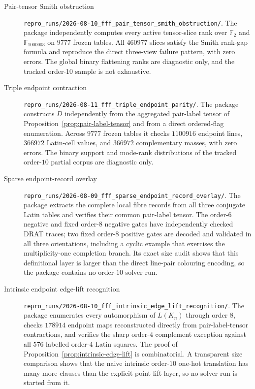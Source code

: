 \begin{description}
\item[Pair-tensor Smith obstruction]
\nolinkurl{repro_runs/2026-08-10_fff_pair_tensor_smith_obstruction/}.
The package independently computes every active tensor-slice rank over
$\mathbb F_2$ and $\mathbb F_{1000003}$ on $9777$ frozen tables.  All
$460977$ slices satisfy the Smith rank-gap formula and reproduce the direct
three-view failure pattern, with zero errors.  The global binary flattening
ranks are diagnostic only, and the tracked order-$10$ sample is not
exhaustive.

\item[Triple endpoint contraction]
\nolinkurl{repro_runs/2026-08-11_fff_triple_endpoint_parity/}.
The package constructs $D$ independently from the aggregated pair-label
tensor of Proposition~\ref{prop:pair-label-tensor} and
from a direct ordered-flag enumeration.  Across $9777$ frozen tables it
checks $1100916$ endpoint lines, $366972$ Latin-cell values, and $366972$
complementary masses, with zero errors.  The binary support and mode-rank
distributions of the tracked order-$10$ partial corpus are diagnostic only.

\item[Sparse endpoint-record overlay]
\nolinkurl{repro_runs/2026-08-09_fff_sparse_endpoint_record_overlay/}.
The package extracts the complete local fibre records from all three
conjugate Latin tables and verifies their common pair-label tensor.  The order-$6$
negative and fixed order-$8$ negative gates have independently checked DRAT
traces; two fixed order-$8$ positive gates are decoded and validated in all
three orientations, including a cyclic example that exercises the
multiplicity-one completion branch.  Its exact size audit shows that this
definitional layer is larger than the direct line-pair colouring encoding,
so the package contains no
order-$10$ solver run.

\item[Intrinsic endpoint edge-lift recognition]
\nolinkurl{repro_runs/2026-08-10_fff_intrinsic_edge_lift_recognition/}.
The package enumerates every automorphism of $L(K_n)$ through order $8$,
checks $178914$ endpoint maps reconstructed directly from pair-label-tensor
contractions,
and verifies the sharp order-$4$ complement exception against all $576$
labelled order-$4$ Latin squares.  The proof of
Proposition~\ref{prop:intrinsic-edge-lift} is combinatorial.  A transparent
size comparison shows that the naive intrinsic order-$10$ one-hot translation
has many more clauses than the explicit point-lift layer, so no solver run is
started from it.


\end{description}
